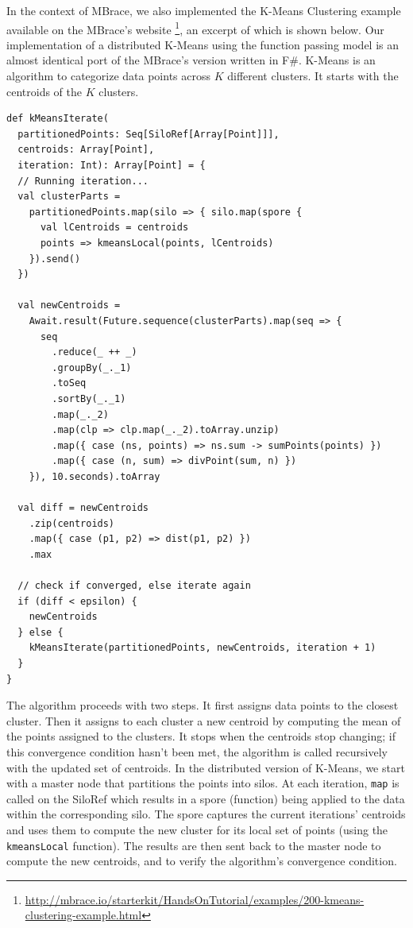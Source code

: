 \documentclass{jfp1}
\begin{document}
In the context of MBrace, we also implemented the K-Means Clustering example
available on the MBrace's website
\footnote{\url{http://mbrace.io/starterkit/HandsOnTutorial/examples/200-kmeans-clustering-example.html}},
an excerpt of which is shown below. Our implementation of a distributed K-Means
using the function passing model is an almost identical port of the MBrace’s
version written in F\#. K-Means is an algorithm to categorize data points across
$K$ different clusters. It starts with the centroids of the $K$ clusters.

\begin{lstlisting}
def kMeansIterate(
  partitionedPoints: Seq[SiloRef[Array[Point]]],
  centroids: Array[Point],
  iteration: Int): Array[Point] = {
  // Running iteration...
  val clusterParts =
    partitionedPoints.map(silo => { silo.map(spore {
      val lCentroids = centroids
      points => kmeansLocal(points, lCentroids)
    }).send()
  })

  val newCentroids =
    Await.result(Future.sequence(clusterParts).map(seq => {
      seq
        .reduce(_ ++ _)
        .groupBy(_._1)
        .toSeq
        .sortBy(_._1)
        .map(_._2)
        .map(clp => clp.map(_._2).toArray.unzip)
        .map({ case (ns, points) => ns.sum -> sumPoints(points) })
        .map({ case (n, sum) => divPoint(sum, n) })
    }), 10.seconds).toArray

  val diff = newCentroids
    .zip(centroids)
    .map({ case (p1, p2) => dist(p1, p2) })
    .max

  // check if converged, else iterate again
  if (diff < epsilon) {
    newCentroids
  } else {
    kMeansIterate(partitionedPoints, newCentroids, iteration + 1)
  }
}
\end{lstlisting}
The algorithm proceeds with two steps. It first assigns data points to the
closest cluster. Then it assigns to each cluster a new centroid by computing the
mean of the points assigned to the clusters. It stops when the centroids stop
changing; if this convergence condition hasn't been met, the algorithm is called
recursively with the updated set of centroids. In the distributed version of
K-Means, we start with a master node that partitions the points into silos. At
each iteration, \verb|map| is called on the SiloRef which results in a spore
(function) being applied to the data within the corresponding silo. The spore
captures the current iterations' centroids and uses them to compute the new
cluster for its local set of points (using the \verb|kmeansLocal| function). The
results are then sent back to the master node to compute the new centroids, and
to verify the algorithm's convergence condition.
\end{document}

